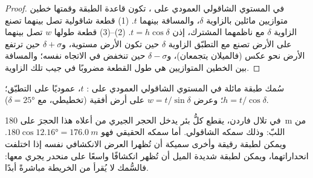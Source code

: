 \begin{proof}
في المستوي الشاقولي العمودي على ، تكون قاعدة الطبقة وقمتها خطين متوازيين مائلين بالزاوية $\delta$، والمسافة بينهما $t$. (1) قطعة شاقولية تصل بينهما تصنع الزاوية $\delta$ مع ناظمهما المشترك، إذن $t = h\cos\delta$. (2)--(3) قطعة طولها $w$ تصل بينهما على الأرض تصنع مع التطبّق الزاوية $\delta$ حين تكون الأرض مستوية، و$\delta + \sigma$ حين ترتفع الأرض نحو عكس  (فالميلان يتجمعان)، و$\delta - \sigma$ حين تنخفض في الاتجاه نفسه؛ والمسافة بين الخطين المتوازيين هي طول القطعة مضروبًا في جيب تلك الزاوية.
\end{proof}

\begin{omfigure}

{\small سُمك طبقة مائلة في المستوي الشاقولي العمودي على :  $t$، عموديًا على التطبّق؛  $h = t/\cos\delta$؛ وعرض  $w = t/\sin\delta$ على أرض أفقية (تخطيطي، مع $\delta = \ang{25}$).}
\end{omfigure}

في تلال فاردن، يقطع كلُّ بئر يدخل الحجر الجيري من أعلاه هذا الحجرَ على \qty{180}{m} من اللبّ: وذلك سمكه الشاقولي. أما سمكه الحقيقي فهو $180\cos\ang{12.16} = \qty{176.0}{m}$. ويمكن لطبقة رقيقة وأخرى سميكة أن تُظهرا العرض الانكشافي نفسه إذا اختلفت انحداراتهما، ويمكن لطبقة شديدة الميل أن تُظهر انكشافًا واسعًا على منحدر يجري معها: فالسُّمك لا يُقرأ من الخريطة مباشرةً أبدًا.

